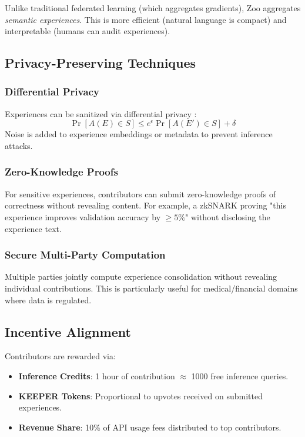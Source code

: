 \documentclass[11pt,a4paper]{article}
\begin{document}
Unlike traditional federated learning (which aggregates gradients), Zoo aggregates \textit{semantic experiences}. This is more efficient (natural language is compact) and interpretable (humans can audit experiences).

\subsection{Privacy-Preserving Techniques}

\subsubsection{Differential Privacy}

Experiences can be sanitized via differential privacy \cite{dwork2014algorithmic}:
\[
\Pr[A(E) \in S] \leq e^\epsilon \Pr[A(E') \in S] + \delta
\]
Noise is added to experience embeddings or metadata to prevent inference attacks.

\subsubsection{Zero-Knowledge Proofs}

For sensitive experiences, contributors can submit zero-knowledge proofs of correctness without revealing content. For example, a zkSNARK \cite{bitansky2013snarks} proving "this experience improves validation accuracy by $\geq 5\%$" without disclosing the experience text.

\subsubsection{Secure Multi-Party Computation}

Multiple parties jointly compute experience consolidation without revealing individual contributions. This is particularly useful for medical/financial domains where data is regulated.

\subsection{Incentive Alignment}

Contributors are rewarded via:
\begin{itemize}
\item \textbf{Inference Credits}: 1 hour of contribution $\approx$ 1000 free inference queries.
\item \textbf{KEEPER Tokens}: Proportional to upvotes received on submitted experiences.
\item \textbf{Revenue Share}: 10\% of API usage fees distributed to top contributors.
\end{itemize}
\end{document}
